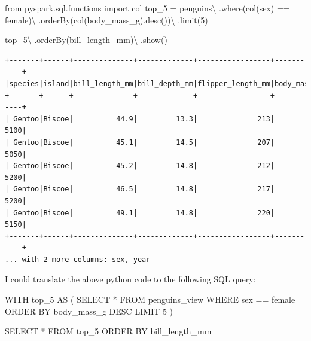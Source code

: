 \documentclass[
  11pt,
  letterpaper,
  DIV=11,
  numbers=noendperiod]{scrreprt}
\newenvironment{Shaded}{\begin{snugshade}}{\end{snugshade}}
\newcommand{\DecValTok}[1]{\textcolor[rgb]{0.68,0.00,0.00}{#1}}
\newcommand{\ImportTok}[1]{\textcolor[rgb]{0.00,0.46,0.62}{#1}}
\newcommand{\KeywordTok}[1]{\textcolor[rgb]{0.00,0.23,0.31}{#1}}
\newcommand{\NormalTok}[1]{\textcolor[rgb]{0.00,0.23,0.31}{#1}}
\newcommand{\OperatorTok}[1]{\textcolor[rgb]{0.37,0.37,0.37}{#1}}
\newcommand{\StringTok}[1]{\textcolor[rgb]{0.13,0.47,0.30}{#1}}
\begin{document}
\begin{Shaded}
\begin{Highlighting}[]
\ImportTok{from}\NormalTok{ pyspark.sql.functions }\ImportTok{import}\NormalTok{ col}
\NormalTok{top\_5 }\OperatorTok{=}\NormalTok{ penguins}\OperatorTok{\textbackslash{}}
\NormalTok{    .where(col(}\StringTok{\textquotesingle{}sex\textquotesingle{}}\NormalTok{) }\OperatorTok{==} \StringTok{\textquotesingle{}female\textquotesingle{}}\NormalTok{)}\OperatorTok{\textbackslash{}}
\NormalTok{    .orderBy(col(}\StringTok{\textquotesingle{}body\_mass\_g\textquotesingle{}}\NormalTok{).desc())}\OperatorTok{\textbackslash{}}
\NormalTok{    .limit(}\DecValTok{5}\NormalTok{)}

\NormalTok{top\_5}\OperatorTok{\textbackslash{}}
\NormalTok{    .orderBy(}\StringTok{\textquotesingle{}bill\_length\_mm\textquotesingle{}}\NormalTok{)}\OperatorTok{\textbackslash{}}
\NormalTok{    .show()}
\end{Highlighting}
\end{Shaded}

\begin{verbatim}
+-------+------+--------------+-------------+-----------------+-----------+
|species|island|bill_length_mm|bill_depth_mm|flipper_length_mm|body_mass_g|
+-------+------+--------------+-------------+-----------------+-----------+
| Gentoo|Biscoe|          44.9|         13.3|              213|       5100|
| Gentoo|Biscoe|          45.1|         14.5|              207|       5050|
| Gentoo|Biscoe|          45.2|         14.8|              212|       5200|
| Gentoo|Biscoe|          46.5|         14.8|              217|       5200|
| Gentoo|Biscoe|          49.1|         14.8|              220|       5150|
+-------+------+--------------+-------------+-----------------+-----------+
... with 2 more columns: sex, year
\end{verbatim}

I could translate the above python code to the following SQL query:

\begin{Shaded}
\begin{Highlighting}[]
\KeywordTok{WITH}\NormalTok{ top\_5 }\KeywordTok{AS}\NormalTok{ (}
    \KeywordTok{SELECT} \OperatorTok{*}
    \KeywordTok{FROM}\NormalTok{ penguins\_view}
    \KeywordTok{WHERE}\NormalTok{ sex }\OperatorTok{==} \StringTok{\textquotesingle{}female\textquotesingle{}}
    \KeywordTok{ORDER} \KeywordTok{BY}\NormalTok{ body\_mass\_g }\KeywordTok{DESC}
    \KeywordTok{LIMIT} \DecValTok{5}
\NormalTok{)}

\KeywordTok{SELECT} \OperatorTok{*}
\KeywordTok{FROM}\NormalTok{ top\_5}
\KeywordTok{ORDER} \KeywordTok{BY}\NormalTok{ bill\_length\_mm}
\end{Highlighting}
\end{Shaded}
\end{document}
